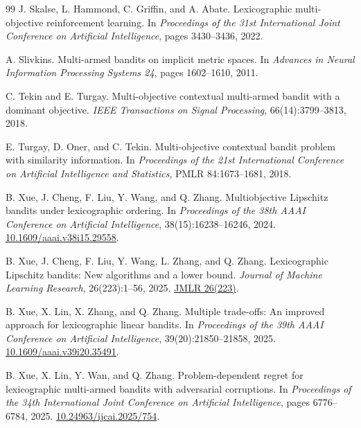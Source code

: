 \documentclass[11pt]{article}
\theoremstyle{definition}
\begin{document}
\begin{thebibliography}{99}
J. Skalse, L. Hammond, C. Griffin, and A. Abate.
\newblock Lexicographic multi-objective reinforcement learning.
\newblock In \emph{Proceedings of the 31st International Joint Conference on Artificial Intelligence}, pages 3430--3436, 2022.

A. Slivkins.
\newblock Multi-armed bandits on implicit metric spaces.
\newblock In \emph{Advances in Neural Information Processing Systems 24}, pages 1602--1610, 2011.

C. Tekin and E. Turgay.
\newblock Multi-objective contextual multi-armed bandit with a dominant objective.
\newblock \emph{IEEE Transactions on Signal Processing}, 66(14):3799--3813, 2018.

E. Turgay, D. Oner, and C. Tekin.
\newblock Multi-objective contextual bandit problem with similarity information.
\newblock In \emph{Proceedings of the 21st International Conference on Artificial Intelligence and Statistics}, PMLR 84:1673--1681, 2018.

B. Xue, J. Cheng, F. Liu, Y. Wang, and Q. Zhang.
\newblock Multiobjective Lipschitz bandits under lexicographic ordering.
\newblock In \emph{Proceedings of the 38th AAAI Conference on Artificial Intelligence}, 38(15):16238--16246, 2024.
\newblock \href{https://doi.org/10.1609/aaai.v38i15.29558}{10.1609/aaai.v38i15.29558}.

B. Xue, J. Cheng, F. Liu, Y. Wang, L. Zhang, and Q. Zhang.
\newblock Lexicographic Lipschitz bandits: New algorithms and a lower bound.
\newblock \emph{Journal of Machine Learning Research}, 26(223):1--56, 2025.
\newblock \href{https://www.jmlr.org/papers/v26/24-1047.html}{JMLR 26(223)}.

B. Xue, X. Lin, X. Zhang, and Q. Zhang.
\newblock Multiple trade-offs: An improved approach for lexicographic linear bandits.
\newblock In \emph{Proceedings of the 39th AAAI Conference on Artificial Intelligence}, 39(20):21850--21858, 2025.
\newblock \href{https://doi.org/10.1609/aaai.v39i20.35491}{10.1609/aaai.v39i20.35491}.

B. Xue, X. Lin, Y. Wan, and Q. Zhang.
\newblock Problem-dependent regret for lexicographic multi-armed bandits with adversarial corruptions.
\newblock In \emph{Proceedings of the 34th International Joint Conference on Artificial Intelligence}, pages 6776--6784, 2025.
\newblock \href{https://doi.org/10.24963/ijcai.2025/754}{10.24963/ijcai.2025/754}.


\end{thebibliography}
\end{document}
